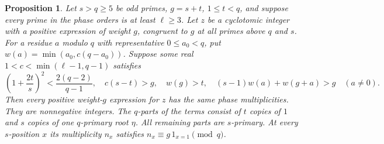 \documentclass[11pt,a4paper]{article}
\numberwithin{equation}{section}
\newtheorem{proposition}[theorem]{Proposition}
\theoremstyle{remark}
\begin{document}
\begin{proposition}\label{found:C:3.1}\label{found:C:key:prop:above-prime}
Let $s>q\ge5$ be odd primes, $g=s+t$, $1\le t<q$, and
suppose every prime in the phase orders is at least $\ell\ge3$.
Let $z$ be a cyclotomic integer with a positive expression of weight
$g$, congruent to $g$ at all primes above $q$ and $s$. For a residue
$a$ modulo $q$ with representative $0\le a_0<q$, put
$w(a)=\min(a_0,c(q-a_0))$. Suppose some real $1<c<\min(\ell-1,q-1)$
satisfies
\[
 \left(1+\frac{2t}{s}\right)^2<\frac{2(q-2)}{q-1},
 \quad c(s-t)>g,\quad w(g)>t,\quad
 (s-1)w(a)+w(g+a)>g\quad(a\ne0).
\]
Then every positive weight-$g$ expression for $z$ has the same
phase multiplicities. They are nonnegative integers. The $q$-parts
of the terms consist of $t$ copies of $1$ and $s$ copies of one
$q$-primary root $\eta$. All remaining parts are $s$-primary.
At every $s$-position $x$ its multiplicity $n_x$ satisfies
$n_x\equiv g\,1_{x=1}\pmod q$.
\end{proposition}
\end{document}
